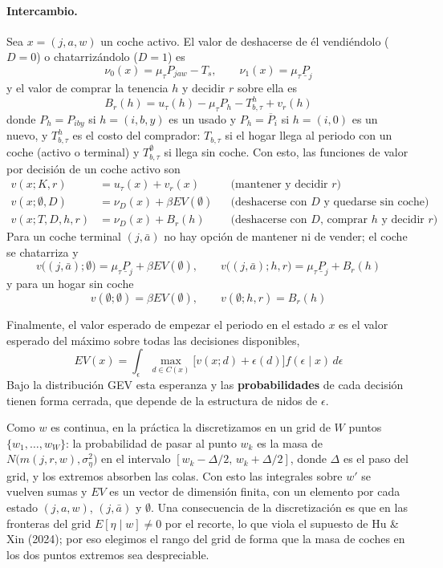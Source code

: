 \documentclass{article}
\begin{document}
\paragraph{Intercambio.} Sea $x=(j,a,w)$ un coche activo. El valor de deshacerse de él vendiéndolo ($D=0$) o chatarrizándolo ($D=1$) es
$$\nu_0(x)=\mu_\tau P_{jaw}-T_s,\qquad \nu_1(x)=\mu_\tau\underline{P}_j$$
y el valor de comprar la tenencia $h$ y decidir $r$ sobre ella es
$$B_r(h)=u_\tau(h)-\mu_\tau P_h-T_{b,\tau}^h+v_r(h)$$
donde $P_h=P_{iby}$ si $h=(i,b,y)$ es un usado y $P_h=\overline{P}_i$ si $h=(i,0)$ es un nuevo, y $T_{b,\tau}^h$ es el costo del comprador: $T_{b,\tau}$ si el hogar llega al periodo con un coche (activo o terminal) y $T^{\emptyset}_{b,\tau}$ si llega sin coche. Con esto, las funciones de valor por decisión de un coche activo son
$$\begin{aligned}
v(x;K,r)&=u_\tau(x)+v_r(x) &&\text{(mantener y decidir $r$)}\\
v(x;\emptyset,D)&=\nu_D(x)+\beta EV(\emptyset) &&\text{(deshacerse con $D$ y quedarse sin coche)}\\
v(x;T,D,h,r)&=\nu_D(x)+B_r(h) &&\text{(deshacerse con $D$, comprar $h$ y decidir $r$)}
\end{aligned}$$
Para un coche terminal $(j,\bar{a})$ no hay opción de mantener ni de vender; el coche se chatarriza y
$$v\big((j,\bar{a});\emptyset\big)=\mu_\tau\underline{P}_j+\beta EV(\emptyset),\qquad v\big((j,\bar{a});h,r\big)=\mu_\tau\underline{P}_j+B_r(h)$$
y para un hogar sin coche
$$v(\emptyset;\emptyset)=\beta EV(\emptyset),\qquad v(\emptyset;h,r)=B_r(h)$$

Finalmente, el valor esperado de empezar el periodo en el estado $x$ es el valor esperado del máximo sobre todas las decisiones disponibles,
$$EV(x)=\int_\epsilon\max_{d\in C(x)}\big[v(x;d)+\epsilon(d)\big]f(\epsilon\mid x)\,d\epsilon$$
Bajo la distribución GEV esta esperanza y las \textbf{probabilidades} de cada decisión tienen forma cerrada, que depende de la estructura de nidos de $\epsilon$.

Como $w$ es continua, en la práctica la discretizamos en un grid de $W$ puntos $\{w_1,\dots,w_W\}$: la probabilidad de pasar al punto $w_k$ es la masa de $N\big(m(j,r,w),\sigma_\eta^2\big)$ en el intervalo $[w_k-\Delta/2,\,w_k+\Delta/2]$, donde $\Delta$ es el paso del grid, y los extremos absorben las colas. Con esto las integrales sobre $w'$ se vuelven sumas y $EV$ es un vector de dimensión finita, con un elemento por cada estado $(j,a,w)$, $(j,\bar{a})$ y $\emptyset$. Una consecuencia de la discretización es que en las fronteras del grid $E[\eta\mid w]\neq0$ por el recorte, lo que viola el supuesto de Hu \& Xin (2024); por eso elegimos el rango del grid de forma que la masa de coches en los dos puntos extremos sea despreciable.
\end{document}
